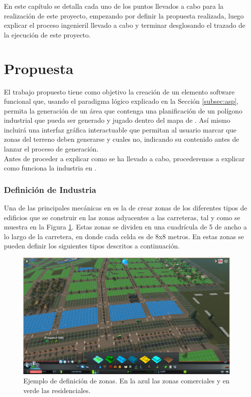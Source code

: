 En este capítulo se detalla cada uno de los puntos llevados a cabo para la realización de este proyecto, empezando por definir la propuesta realizada, luego explicar el proceso ingenieril llevado a cabo y terminar desglosando el trazado de la ejecución de este proyecto.

\section{Propuesta}

El trabajo propuesto tiene como objetivo la creación de un elemento software funcional que, usando el paradigma lógico explicado en la Sección \ref{subsec:asp}, permita la generación de un área que contenga una planificación de un polígono industrial que pueda ser generado y jugado dentro del mapa de \cities. Así mismo incluirá una interfaz gráfica interactuable que permitan al usuario marcar que zonas del terreno deben generarse y cuales no, indicando su contenido antes de lanzar el proceso de generación. \\

Antes de proceder a explicar como se ha llevado a cabo, procederemos a explicar como funciona la industria en \cities.

\subsubsection{Definición de Industria}
\label{subsubsec:terrain}

Una de las principales mecánicas en \cities es la de crear zonas de los diferentes tipos de edificios que se construir en las zonas adyacentes a las carreteras, tal y como se muestra en la Figura \ref{fig:zoneo}. Estas zonas se dividen en una cuadrícula de 5 de ancho a lo largo de la carretera, en donde cada celda es de 8x8 metros. En estas zonas se pueden definir los siguientes tipos descritos a continuación.

\begin{figure}[h]
	\centering
	\includegraphics[width=\textwidth]{images/zoneo}
	\caption{Ejemplo de definición de zonas. En la azul las zonas comerciales y en verde las residenciales.}
	\label{fig:zoneo}
\end{figure}

